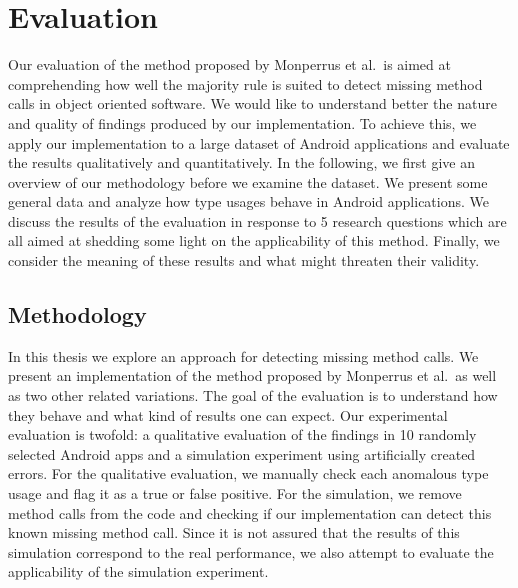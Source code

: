 \chapter{Evaluation}\label{ch:eval}


Our evaluation of the method proposed by Monperrus et al.\ is aimed at comprehending how well the majority rule is suited to detect missing method calls in object oriented software.
We would like to understand better the nature and quality of findings produced by our implementation.
To achieve this, we apply our implementation to a large dataset of Android applications and evaluate the results qualitatively and quantitatively.
In the following, we first give an overview of our methodology before we examine the dataset.
We present some general data and analyze how type usages behave in Android applications.
We discuss the results of the evaluation in response to 5 research questions which are all aimed at shedding some light on the applicability of this method.
Finally, we consider the meaning of these results and what might threaten their validity.

\section{Methodology}

In this thesis we explore an approach for detecting missing method calls.
We present an implementation of the method proposed by Monperrus et al.\ as well as two other related variations.
The goal of the evaluation is to understand how they behave and what kind of results one can expect.
Our experimental evaluation is twofold: a qualitative evaluation of the findings in 10 randomly selected Android apps and a simulation experiment using artificially created errors.
For the qualitative evaluation, we manually check each anomalous type usage and flag it as a true or false positive.
For the simulation, we remove method calls from the code and checking if our implementation can detect this known missing method call.
Since it is not assured that the results of this simulation correspond to the real performance, we also attempt to evaluate the applicability of the simulation experiment.

